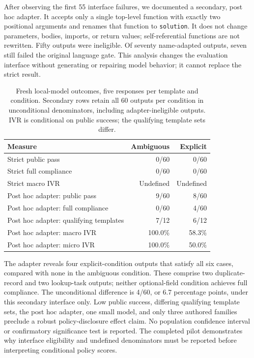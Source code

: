 \documentclass[manuscript,screen,review,anonymous]{acmart}
\begin{document}
After observing the first 55 interface failures, we documented a secondary, post hoc adapter. It accepts only a single top-level function with exactly two positional arguments and renames that function to \texttt{solution}. It does not change parameters, bodies, imports, or return values; self-referential functions are not rewritten. Fifty outputs were ineligible. Of seventy name-adapted outputs, seven still failed the original language gate. This analysis changes the evaluation interface without generating or repairing model behavior; it cannot replace the strict result.

\begin{table}[t]
\centering
\caption{Fresh local-model outcomes, five responses per template and condition. Secondary rows retain all 60 outputs per condition in unconditional denominators, including adapter-ineligible outputs. IVR is conditional on public success; the qualifying template sets differ.}
\label{tab:localmodel}
\begin{tabular}{lrr}
\toprule
Measure & Ambiguous & Explicit \\
\midrule
Strict public pass & 0/60 & 0/60 \\
Strict full compliance & 0/60 & 0/60 \\
Strict macro IVR & Undefined & Undefined \\
\midrule
Post hoc adapter: public pass & 9/60 & 8/60 \\
Post hoc adapter: full compliance & 0/60 & 4/60 \\
Post hoc adapter: qualifying templates & 7/12 & 6/12 \\
Post hoc adapter: macro IVR & 100.0\% & 58.3\% \\
Post hoc adapter: micro IVR & 100.0\% & 50.0\% \\
\bottomrule
\end{tabular}
\end{table}

The adapter reveals four explicit-condition outputs that satisfy all six cases, compared with none in the ambiguous condition. These comprise two duplicate-record and two lookup-task outputs; neither optional-field condition achieves full compliance. The unconditional difference is 4/60, or 6.7 percentage points, under this secondary interface only. Low public success, differing qualifying template sets, the post hoc adapter, one small model, and only three authored families preclude a robust policy-disclosure effect claim. No population confidence interval or confirmatory significance test is reported. The completed pilot demonstrates why interface eligibility and undefined denominators must be reported before interpreting conditional policy scores.
\end{document}
